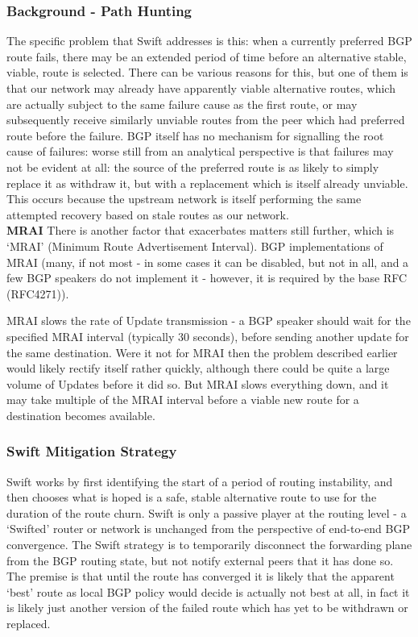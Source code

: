 \subsubsection{Background - Path Hunting}
The specific problem that Swift addresses is this: when a currently preferred BGP route fails, there may be an extended period of time before an alternative stable, viable, route is selected.
There can be various reasons for this, but one of them is that our network may already have apparently viable alternative routes, which are actually subject to the same failure cause as the first route, or may subsequently receive similarly unviable routes from the peer which had preferred route before the failure.
BGP itself has no mechanism for signalling the root cause of failures: worse still from an analytical perspective is that failures may not be evident at all: the source of the preferred route is as likely to simply replace it as withdraw it, but with a replacement which is itself already unviable.
This occurs because the upstream network is itself performing the same attempted recovery based on stale routes as our network.
\\\textbf{MRAI} There is another factor that exacerbates matters still further, which is `MRAI' (Minimum Route Advertisement Interval).  BGP implementations of MRAI (many, if not most - in some cases it can be disabled, but not in all, and a few BGP speakers do not implement it - however, it is required by the base RFC (RFC4271)).



MRAI slows the rate of Update transmission - a BGP speaker should wait for the specified MRAI interval (typically 30 seconds), before sending another update for the same destination.
Were it not for MRAI then the problem described earlier would likely rectify itself rather quickly, although there could be quite a large volume of Updates before it did so.
But MRAI slows everything down, and it may take multiple of the MRAI interval before a viable new route for a destination becomes available.
\subsubsection{Swift Mitigation Strategy}
Swift works by first identifying the start of a period of routing instability, and then chooses what is hoped is a safe, stable alternative route to use for the duration of the route churn.
Swift is only a passive player at the routing level - a `Swifted' router or network is unchanged from the perspective of end-to-end BGP convergence.
The Swift strategy is to temporarily disconnect the forwarding plane from the BGP routing state, but not notify external peers that it has done so.
The premise is that until the route has converged it is likely that the apparent `best' route as local BGP policy would decide is actually not best at all, in fact it is likely just another version of the failed route which has yet to be withdrawn or replaced.

